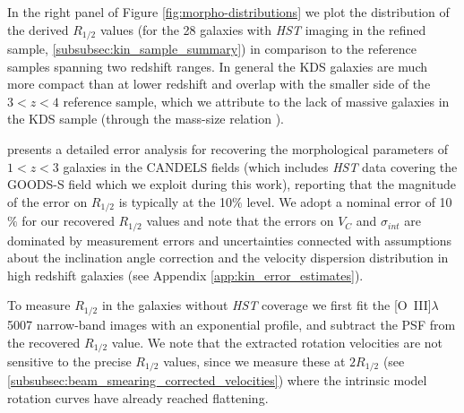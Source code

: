 \documentclass[fleqn,usenatbib]{mn2e}
\begin{document}
In the right panel of Figure \ref{fig:morpho-distributions} we plot the distribution of the derived $R_{1/2}$ values (for the 28 galaxies with {\em HST} imaging in the refined sample, \cref{subsubsec:kin_sample_summary}) in comparison to the reference samples spanning two redshift ranges.
In general the KDS galaxies are much more compact than at lower redshift and overlap with the smaller side of the $3 < z < 4$ reference sample, which we attribute to the lack of massive galaxies in the KDS sample (through the mass-size relation \citep[e.g.][]{Trujillo2004}).

\cite{Bruce2012} presents a detailed error analysis for recovering the morphological parameters of $1 < z < 3$ galaxies in the CANDELS fields (which includes {\em HST} data covering the GOODS-S field which we exploit during this work), reporting that the magnitude of the error on $R_{1/2}$ is typically at the 10$\%$ level.
We adopt a nominal error of 10$\%$ for our recovered $R_{1/2}$ values and note that the errors on $V_{C}$ and $\sigma_{int}$ are dominated by measurement errors and uncertainties connected with assumptions about the inclination angle correction and the velocity dispersion distribution in high redshift galaxies (see Appendix \ref{app:kin_error_estimates}).

To measure $R_{1/2}$ in the galaxies without {\em HST} coverage we first fit the [O~{\sc III}]$\lambda$5007 narrow-band images with an exponential profile, and subtract the PSF from the recovered $R_{1/2}$ value.
We note that the extracted rotation velocities are not sensitive to the precise $R_{1/2}$ values, since we measure these at $2R_{1/2}$ (see \cref{subsubsec:beam_smearing_corrected_velocities}) where the intrinsic model rotation curves have already reached flattening. \\
\end{document}
